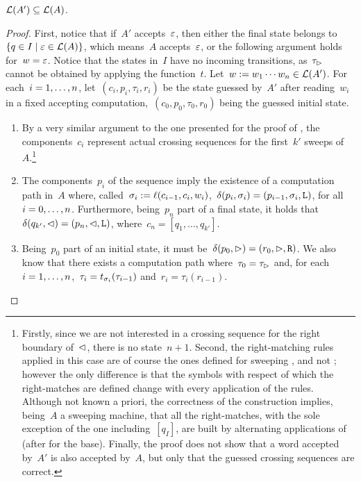 \begin{lemm}\label{lem:swkLAtoNFA-2}
	$\mathcal L(A')\subseteq\mathcal L(A)$.
\end{lemm}
\begin{proof}
	First, notice that if~$A'$ accepts~$\varepsilon$, then either the final state belongs to~$\{q\in I\mid \varepsilon\in\mathcal L(A)\}$, which means~$A$ accepts~$\varepsilon$, or the following argument holds for~$w=\varepsilon$.
	Notice that the states in~$I$ have no incoming transitions, as~$\tau_\rhd$ cannot be obtained by applying the function~$t$.
	Let~$w:=w_1\cdots w_n\in\mathcal L(A')$. For each~$i=1,\dots,n$, let~$(c_i,p_i,\tau_i,r_i)$ be the state guessed by~$A'$ after reading~$w_i$ in a fixed accepting computation,~$(c_0,p_0,\tau_0,r_0)$ being the guessed initial state.
	\begin{enumerate}
		\item By a very similar argument to the one presented for the proof of , the components~$c_i$ represent actual crossing sequences for the first~$k'$ sweeps of~$A$.\footnote{%
			      Firstly, since we are not interested in a crossing sequence for the right boundary of~$\lhd$, there is no state~$n+1$.
			      Second, the right-matching rules applied in this case are of course the ones defined for sweeping \kDLAs, and not \TDFAs; however the only difference is that the symbols with respect of which the right-matches are defined change with every application of the rules.
			      Although not known a priori, the correctness of the construction implies, being~$A$ a sweeping machine, that all the right-matches, with the sole exception of the one including~$[q_I]$, are built by alternating applications of  (after  for the base).
			      Finally, the proof does not show that a word accepted by~$A'$ is also accepted by~$A$, but only that the guessed crossing sequences are correct.}
		\item The components~$p_i$ of the sequence imply the existence of a computation path in~$A$ where, called~$\sigma_i:=\ell(c_{i-1},c_i,w_i)$,~$\delta(p_i,\sigma_i)=(p_{i-1},\sigma_i,\mathtt L)$, for all~$i=0,\dots,n$.
		      Furthermore, being~$p_n$ part of a final state, it holds that~$\delta(q_{k'},\lhd)=(p_n,\lhd,\mathtt L)$, where~$c_n=[q_1,\dots,q_{k'}]$.
		\item Being~$p_0$ part of an initial state, it must be~$\delta(p_0,\rhd)=(r_0,\rhd,\mathtt R)$.
		      We also know that there exists a computation path where~$\tau_0=\tau_\rhd$ and, for each~$i=1,\dots,n$,~$\tau_i=t_{\sigma_i}(\tau_{i-1})$ and~$r_i=\tau_i(r_{i-1})$.

\end{enumerate}
\end{proof}
